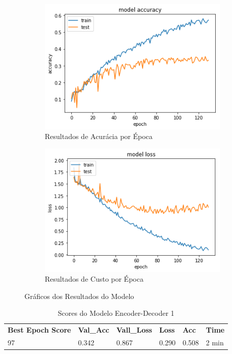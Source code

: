 \begin{figure}[H]
  \centering
  \begin{subfigure}[b]{0.45\linewidth}
    \includegraphics[width=\linewidth]{img/enc-dec-1.png}
    \caption{Resultados de Acurácia por Época}
  \end{subfigure}
  \begin{subfigure}[b]{0.45\linewidth}
    \includegraphics[width=\linewidth]{img/enc-dec-1-loss.png}
    \caption{Resultados de Custo por Época}
  \end{subfigure}
  \caption{Gráficos dos Resultados do Modelo}
  \label{fig:plots1}
\end{figure}

\begin{table}[H]
\centering
\begin{tabular}{llllll}
\textbf{Best Epoch Score} & \textbf{Val\_Acc} & \textbf{Vall\_Loss} & \textbf{Loss} & \textbf{Acc} & \textbf{Time} \\
97 & 0.342 & 0.867 & 0.290 & 0.508 & 2 min
\end{tabular}
\caption{Scores do Modelo Encoder-Decoder 1}
\label{tab:res-enc-dec-1}
\end{table}


